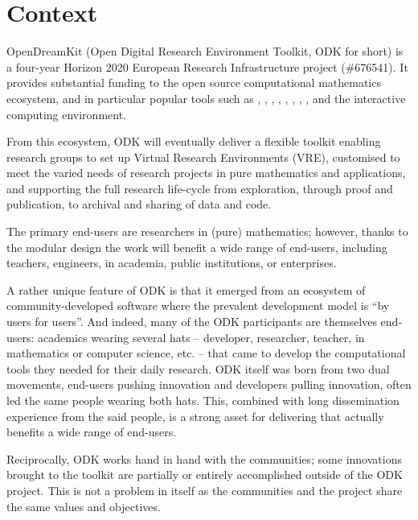 \documentclass{deliverablereport}
\author{Benoît Pilorget et al.}
\begin{document}
\enlargethispage{4ex}
\maketitle
\githubissuedescription
\tableofcontents\newpage


\section{Context}

OpenDreamKit (Open Digital Research Environment Toolkit, ODK for short) is a four-year Horizon 2020 European Research Infrastructure project (\#676541). It provides substantial funding to the open source computational mathematics ecosystem, and in particular popular tools such as \Linbox, \MPIR, \Sage, \GAP, \PariGP, \LMFDB, \Singular, \MathHub, and the \Jupyter interactive computing environment.

From this ecosystem, ODK will eventually deliver a flexible toolkit enabling research groups to set up Virtual Research Environments (VRE), customised to meet the varied needs of research projects in pure mathematics and applications, and supporting the full research life-cycle from exploration, through proof and publication, to archival and sharing of data and code.

The primary end-users are researchers in (pure) mathematics; however,
thanks to the modular design the work will benefit a wide range of
end-users, including teachers, engineers, in academia, public
institutions, or enterprises.

A rather unique feature of ODK is that it emerged from an ecosystem of
community-developed software where the prevalent development model is
``by users for users''. And indeed, many of the ODK participants are
themselves end-users: academics wearing several hats -- developer,
researcher, teacher, in mathematics or computer science, etc. -- that
came to develop the computational tools they needed for their daily
research. ODK itself was born from two dual movements,
end-users pushing innovation and developers pulling innovation, often
led the same people wearing both hats. This, combined with long
dissemination experience from the said people, is a strong asset for
delivering that actually benefits a wide range of end-users.

Reciprocally, ODK works hand in hand with the communities; some
innovations brought to the toolkit are partially or entirely
accomplished outside of the ODK project. This is not a
problem in itself as the communities and the project share the same
values and objectives.
\end{document}
